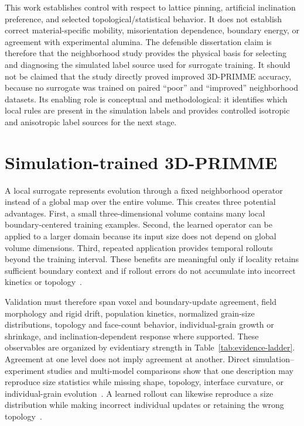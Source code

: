 \documentclass[proposalMode]{ufdissertation}
\begin{document}
This work establishes control with respect to lattice pinning, artificial inclination preference, and selected topological/statistical behavior. It does not establish correct material-specific mobility, misorientation dependence, boundary energy, or agreement with experimental alumina. The defensible dissertation claim is therefore that the neighborhood study provides the physical basis for selecting and diagnosing the simulated label source used for surrogate training. It should not be claimed that the study directly proved improved 3D-PRIMME accuracy, because no surrogate was trained on paired ``poor'' and ``improved'' neighborhood datasets. Its enabling role is conceptual and methodological: it identifies which local rules are present in the simulation labels and provides controlled isotropic and anisotropic label sources for the next stage.

\bigskip

\section{Simulation-trained 3D-PRIMME}

A local surrogate represents evolution through a fixed neighborhood operator instead of a global map over the entire volume. This creates three potential advantages. First, a small three-dimensional volume contains many local boundary-centered training examples. Second, the learned operator can be applied to a larger domain because its input size does not depend on global volume dimensions. Third, repeated application provides temporal rollouts beyond the training interval. These benefits are meaningful only if locality retains sufficient boundary context and if rollout errors do not accumulate into incorrect kinetics or topology~\cite{montes2021surrogate,yan2022primme,qin2024graingnn,tep2025grain,tian2026threeDprimme}.

Validation must therefore span voxel and boundary-update agreement, field morphology and rigid drift, population kinetics, normalized grain-size distributions, topology and face-count behavior, individual-grain growth or shrinkage, and inclination-dependent response where supported. These observables are organized by evidentiary strength in Table~\ref{tab:evidence-ladder}.
Agreement at one level does not imply agreement at another. Direct simulation--experiment studies and multi-model comparisons show that one description may reproduce size statistics while missing shape, topology, interface curvature, or individual-grain evolution~\cite{mckenna2014fourD,rowenhorst2010topology,martine2019metrics}. A learned rollout can likewise reproduce a size distribution while making incorrect individual updates or retaining the wrong topology~\cite{tian2026threeDprimme,tian2026experiment}.
\end{document}
